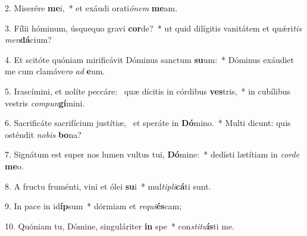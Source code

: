2. Miserére \textbf{me}i,~*  et exáudi orati\textit{ó}\textit{nem} \textbf{me}am.\

3. Fílii hóminum, úsquequo gravi \textbf{cor}de?~*  ut quid dilígitis vanitátem et quǽri\textit{tis} \textit{men}\textbf{dá}cium?\

4. Et scitóte quóniam mirificávit Dóminus sanctum \textbf{su}um:~*  Dóminus exáudiet me cum clamáve\textit{ro} \textit{ad} \textbf{e}um.\

5. Irascímini, et nolíte peccáre: \dag\  quæ dícitis in córdibus \textbf{ves}tris,~*  in cubílibus vestris \textit{com}\textit{pun}\textbf{gí}mini.\

6. Sacrificáte sacrifícium justítiæ, \dag\  et speráte in \textbf{Dó}mino.~*  Multi dicunt: quis osténdit \textit{no}\textit{bis} \textbf{bo}na?\

7. Signátum est super nos lumen vultus tui, \textbf{Dó}mine:~*  dedísti lætítiam in \textit{cor}\textit{de} \textbf{me}o.\

8. A fructu fruménti, vini et ólei \textbf{su}i~*  mul\textit{ti}\textit{pli}\textbf{cá}ti sunt.\

9. In pace in id\textbf{íp}sum~*  dórmiam et \textit{re}\textit{qui}\textbf{és}cam;\

10. Quóniam tu, Dómine, singuláriter \textbf{in} spe~*  con\textit{sti}\textit{tu}\textbf{ís}ti me.\

